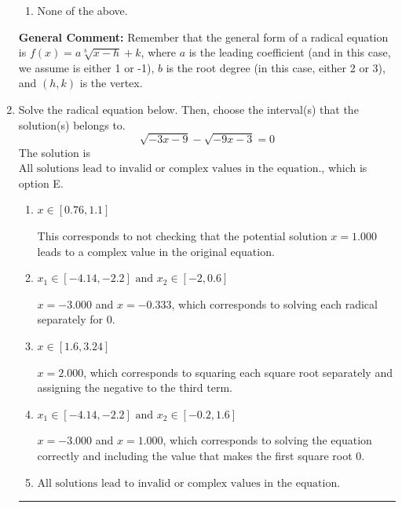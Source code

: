 \documentclass{extbook}[14pt]
\newcommand{\litem}[1]{\item #1

\rule{\textwidth}{0.4pt}}
\begin{document}
\begin{enumerate}
{\begin{enumerate}[label=\Alph*.]
\item None of the above.\end{enumerate}
\textbf{General Comment:} Remember that the general form of a radical equation is $ f(x) = a \sqrt[b]{x - h} + k $, where $a$ is the leading coefficient (and in this case, we assume is either 1 or -1), $b$ is the root degree (in this case, either 2 or 3), and $(h, k)$ is the vertex.
}
\litem{
Solve the radical equation below. Then, choose the interval(s) that the solution(s) belongs to.
\[ \sqrt{-3 x - 9} - \sqrt{-9 x - 3} = 0 \]
The solution is \( \text{All solutions lead to invalid or complex values in the equation.} \), which is option E.\begin{enumerate}[label=\Alph*.]
\item \( x \in [0.76,1.1] \)

This corresponds to not checking that the potential solution $x = 1.000$ leads to a complex value in the original equation.
\item \( x_1 \in [-4.14, -2.2] \text{ and } x_2 \in [-2,0.6] \)

$x = -3.000$ and $x = -0.333$, which corresponds to solving each radical separately for 0.
\item \( x \in [1.6,3.24] \)

$x = 2.000$, which corresponds to squaring each square root separately and assigning the negative to the third term.
\item \( x_1 \in [-4.14, -2.2] \text{ and } x_2 \in [-0.2,1.6] \)

$x = -3.000$ and $x = 1.000$, which corresponds to solving the equation correctly and including the value that makes the first square root 0.
\item \( \text{All solutions lead to invalid or complex values in the equation.} \)


\end{enumerate}}
\end{enumerate}
\end{document}
